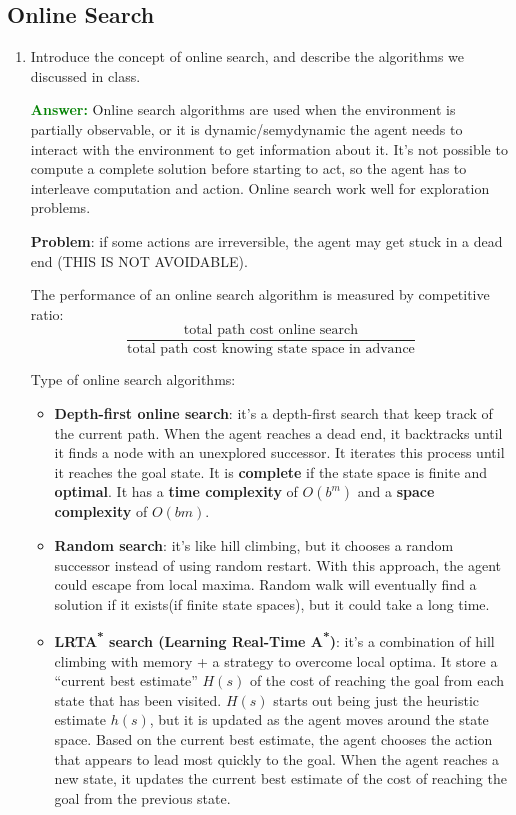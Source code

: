 \documentclass[12pt]{article}
\begin{document}
\subsection{Online Search}\label{onlinesearch}
\begin{enumerate}[label=\textbf{IS.OS.\arabic*}]
    \item Introduce the concept of online search, and describe the algorithms we discussed in class.
    
    \textcolor{green}{\textbf{Answer:}}
    Online search algorithms are used when the environment is partially observable, or it is dynamic/semydynamic 
    the agent needs to interact with the environment to get information about it.
    It's not possible to compute a complete solution before starting to act, so the agent has to interleave computation and action.
    Online search work well for exploration problems.
    
    \textbf{Problem}: if some actions are irreversible, the agent may get stuck in a dead end (THIS IS NOT AVOIDABLE).

    The performance of an online search algorithm is measured by competitive ratio:
    \begin{equation}
        \frac{\text{total path cost online search}}{\text{total path cost knowing state space in advance}}
        \label{eq:competitive-ratio}
    \end{equation}

    Type of online search algorithms:
    \begin{itemize}
        \item \textbf{Depth-first online search}: it's a depth-first search that keep track of the current path.
        When the agent reaches a dead end, it backtracks until it finds a node with an unexplored successor.
        It iterates this process until it reaches the goal state.
        It is \textbf{complete} if the state space is finite and \textbf{optimal}.
        It has a \textbf{time complexity} of $O(b^m)$ and a \textbf{space complexity} of $O(bm)$.
        \item \textbf{Random search}: it's like hill climbing, but it chooses a random successor instead of using random restart.
        With this approach, the agent could escape from local maxima.
        Random walk will eventually find a solution if it exists(if finite state spaces), but it could take a long time.
        
        \item \textbf{LRTA\textsuperscript{*} search (Learning Real-Time A\textsuperscript{*})}: 
        it's a combination of hill climbing with memory + a strategy to overcome local optima.
        It store a ``current best estimate'' $H(s)$ of the cost of reaching the goal from each state that has been visited.
        $H(s)$ starts out being just the heuristic estimate $h(s)$, but it is updated as the agent moves around the state space.
        Based on the current best estimate, the agent chooses the action that appears to lead most quickly to the goal.
        When the agent reaches a new state, it updates the current best estimate of the cost of reaching the goal from 
        the previous state.


\end{itemize}
\end{enumerate}
\end{document}
